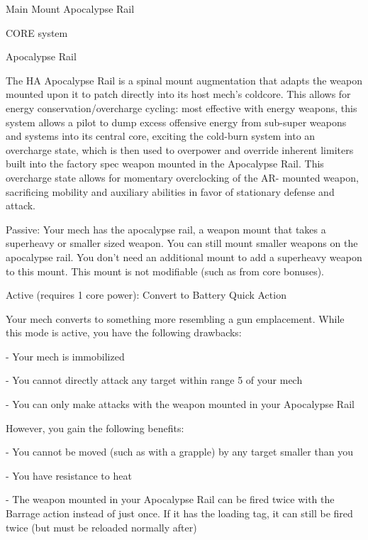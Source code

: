  Main Mount                                          Apocalypse Rail 

                                              CORE system 

                                                                                                          


                                                Apocalypse Rail  

 The HA Apocalypse Rail is a spinal mount augmentation that adapts the weapon mounted upon it to  
 patch directly into its host mech’s coldcore. This allows for energy conservation/overcharge cycling:  
 most effective with energy weapons, this system allows a pilot to dump excess offensive energy from  
 sub-super weapons and systems into its central core, exciting the cold-burn system into an overcharge  
 state, which is then used to overpower and override inherent limiters built into the factory spec weapon  
 mounted in the Apocalypse Rail. This overcharge state allows for momentary overclocking of the AR- 
 mounted weapon, sacrificing mobility and auxiliary abilities in favor of stationary defense and attack.   

 Passive: Your mech has the apocalypse rail, a weapon mount that takes a superheavy or smaller sized  
 weapon. You can still mount smaller weapons on the apocalypse rail. You don’t need an additional  
 mount to add a superheavy weapon to this mount. This mount is not modifiable (such as from core  
 bonuses).
 

 Active (requires 1 core power): Convert to Battery  
 Quick Action
 
 Your mech converts to something more resembling a gun emplacement. While this mode is active, you  
 have the following drawbacks:
 
      -   Your mech is immobilized
 
      -   You cannot directly attack any target within range 5 of your mech
 
      -   You can only make attacks with the weapon mounted in your Apocalypse Rail
 
 However, you gain the following benefits:
 
      -   You cannot be moved (such as with a grapple) by any target smaller than you
 
      -   You have resistance to heat
 
      -   The weapon mounted in your Apocalypse Rail can be fired twice with the Barrage action  
          instead of just once. If it has the loading tag, it can still be fired twice (but must be reloaded  
          normally after) 

